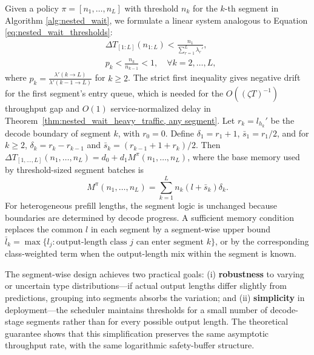 Given a policy $\pi=[n_1,\dots,n_L]$ with threshold $n_k$ for the $k$-th segment in Algorithm \ref{alg:nested_wait}, we formulate a linear system analogous to Equation \eqref{eq:nested_wait_thresholds}:
\begin{equation}          \label{eq:nested_wait_thresholds_L}
    \begin{aligned}
    &\Delta T_{[1:L]}(n_{1:L}) < \frac{n_1}{\sum_{r=1}^L \lambda_r'},  \\
    &p_k < \frac{n_k}{n_{k-1}} < 1,\quad \forall k=2,\dots,L,
    \end{aligned}
\end{equation}
where $p_k =\frac{\lambda'(k \to L)}{\lambda'(k-1 \to L)}$ for \(k\ge2\). The strict first inequality gives negative drift for the first segment's entry queue, which is needed for the \(O((\zeta T)^{-1})\) throughput gap and \(O(1)\) service-normalized delay in Theorem~\ref{thm:nested_wait_heavy_traffic, any segment}. Let \(r_k=l_{h_k}'\) be the decode boundary of segment \(k\), with \(r_0=0\). Define \(\delta_1=r_1+1\), \(\bar s_1=r_1/2\), and for \(k\ge2\), \(\delta_k=r_k-r_{k-1}\) and \(\bar s_k=(r_{k-1}+1+r_k)/2\). Then \(\Delta T_{[1,\dots,L]}(n_1,\dots,n_L)=d_0+d_1M^\pi(n_1,\dots,n_L)\), where the base memory used by threshold-sized segment batches is
\[
M^\pi(n_1, \dots, n_L) = \sum_{k=1}^L n_k (l+\bar s_k)\delta_k.
\]
For heterogeneous prefill lengths, the segment logic is unchanged because boundaries are determined by decode progress. A sufficient memory condition replaces the common \(l\) in each segment by a segment-wise upper bound \(\bar l_k=\max\{l_j: \text{output-length class }j\text{ can enter segment }k\}\), or by the corresponding class-weighted term when the output-length mix within the segment is known.

The segment-wise design achieves two practical goals: (i) \textbf{robustness} to varying or uncertain type distributions---if actual output lengths differ slightly from predictions, grouping into segments absorbs the variation; and (ii) \textbf{simplicity} in deployment---the scheduler maintains thresholds for a small number of decode-stage segments rather than for every possible output length. The theoretical guarantee shows that this simplification preserves the same asymptotic throughput rate, with the same logarithmic safety-buffer structure.

